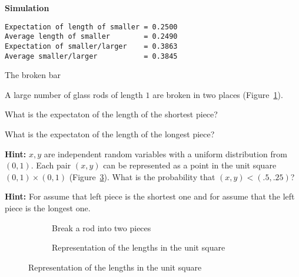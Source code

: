 \textbf{Simulation}
\begin{verbatim}
Expectation of length of smaller = 0.2500
Average length of smaller        = 0.2490
Expectation of smaller/larger    = 0.3863
Average smaller/larger           = 0.3845
\end{verbatim}



\begin{prob}{The broken bar}

A large number of glass rods of length $1$ are broken in two places (Figure~\ref{f.break1}).

 What is the expectaton of the length of the shortest piece?

 What is the expectaton of the length of the longest piece?

\textbf{Hint:} $x,y$ are independent random variables with a uniform distribution from $(0,1)$. Each pair $(x,y)$ can be represented as a point in the unit square $(0,1)\times (0,1)$ (Figure~\ref{f.break2}). What is the probability that $(x,y) < (.5,.25)$? 

\textbf{Hint:} For  assume that left piece is the shortest one and for  assume that the left piece is the longest one.
\begin{figure}[tb]
\begin{center}
\begin{subfigure}{.4\textwidth}
\caption{Break a rod into two pieces\hspace{6em}\mbox{}}\label{f.break1}
\end{subfigure}
\hspace{3em}
\begin{subfigure}{.4\textwidth}
\caption{Representation of the lengths in the unit square}\label{f.break2}
\end{subfigure}
\end{center}
\end{figure}
\end{prob}

